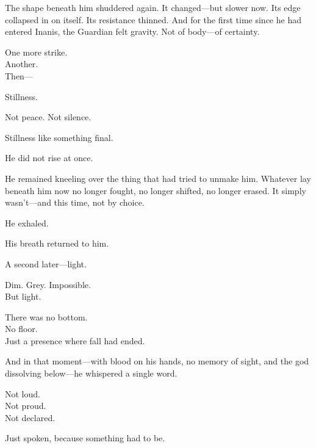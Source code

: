 \documentclass[12pt]{article}
\begin{document}
\vspace{0.5em}
The shape beneath him shuddered again. It changed---but slower now. Its edge collapsed in on itself. Its resistance thinned. And for the first time since he had entered Inanis, the Guardian felt gravity. Not of body---of certainty.

\vspace{0.5em}
One more strike.\\
Another.\\
Then---

\vspace{0.5em}
Stillness.

\vspace{0.5em}
Not peace. Not silence.

\vspace{0.5em}
Stillness like something final.

\vspace{0.5em}
He did not rise at once.

\vspace{0.5em}
He remained kneeling over the thing that had tried to unmake him. Whatever lay beneath him now no longer fought, no longer shifted, no longer erased. It simply wasn’t---and this time, not by choice.

\vspace{0.5em}
He exhaled.

\vspace{0.5em}
His breath returned to him.

\vspace{0.5em}
A second later---light.

\vspace{0.5em}
Dim. Grey. Impossible.\\
But light.

\vspace{0.5em}
There was no bottom.\\
No floor.\\
Just a presence where fall had ended.

\vspace{0.5em}
And in that moment---with blood on his hands, no memory of sight, and the god dissolving below---he whispered a single word.

\vspace{0.5em}
Not loud.\\
Not proud.\\
Not declared.

\vspace{0.5em}
Just spoken, because something had to be.
\end{document}
